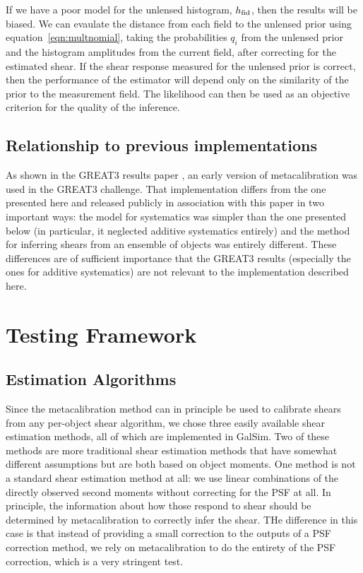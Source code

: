 \documentclass[iop]{emulateapj}
\begin{document}
If we have a poor model for the unlensed histogram, $h_{\rm fid}$, then the results will be biased. We can evaulate the distance from each field to the unlensed prior using equation~\ref{eqn:multnomial}, taking the probabilities $q_i$ from the unlensed prior and the histogram amplitudes from the current field, {after correcting for the estimated shear}. If the shear response measured for the unlensed prior is correct, then the performance of the estimator will depend only on the similarity of the prior to the measurement field. The likelihood can then be used as an objective criterion for the quality of the inference. 

\subsection{Relationship to previous implementations}

As shown in the GREAT3 results paper \citep{2015MNRAS.450.2963M}, an early version of
metacalibration was used in the GREAT3 challenge.  That implementation differs from the one
presented here and released publicly in association with this paper in two important ways: the model
for systematics was simpler than the one presented below (in particular, it neglected additive
systematics entirely) and the method for inferring shears from an ensemble of objects was entirely
different.  These differences are of sufficient importance that the GREAT3 results (especially the
ones for additive systematics) are not relevant to the implementation described here.


\section{Testing Framework}

\subsection{Estimation Algorithms}

Since the metacalibration method can in principle be used to calibrate shears from any per-object
shear algorithm, we chose three easily available shear estimation methods, all of which are
implemented in GalSim.  Two of these methods are more traditional shear estimation methods that have
somewhat different assumptions but are both based on object moments.  One method is not a standard
shear estimation method at all: we use linear combinations of the directly observed second moments
without correcting for the PSF at all.  In principle, the information about how those respond to
shear should be determined by metacalibration to correctly infer the shear.  THe difference in this
case is that instead of providing a small correction to the outputs of a PSF correction method, we
rely on metacalibration to do the entirety of the PSF correction, which is a very stringent test.
\end{document}
